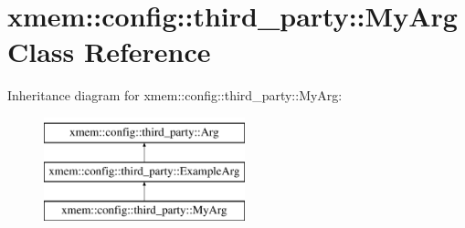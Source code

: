 \hypertarget{classxmem_1_1config_1_1third__party_1_1_my_arg}{\section{xmem\-:\-:config\-:\-:third\-\_\-party\-:\-:My\-Arg Class Reference}
\label{classxmem_1_1config_1_1third__party_1_1_my_arg}
}
Inheritance diagram for xmem\-:\-:config\-:\-:third\-\_\-party\-:\-:My\-Arg\-:\begin{figure}[H]
\begin{center}
\leavevmode
\includegraphics[height=3.000000cm]{classxmem_1_1config_1_1third__party_1_1_my_arg}
\end{center}
\end{figure}
